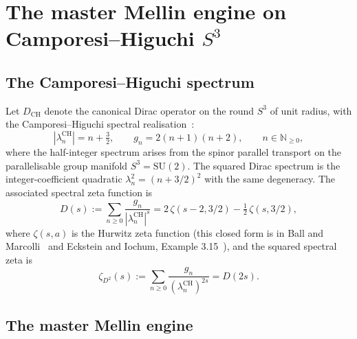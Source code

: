 \documentclass[11pt,a4paper]{article}
\theoremstyle{plain}
\theoremstyle{definition}
\newcommand{\sthree}{S^{3}}
\newcommand{\N}{\mathbb{N}}
\newcommand{\DCH}{D_{\mathrm{CH}}}
\begin{document}
\section{The master Mellin engine on Camporesi--Higuchi $\sthree$}
\label{sec:master_engine}

\subsection{The Camporesi--Higuchi spectrum}

Let $\DCH$ denote the canonical Dirac operator on the round $\sthree$
of unit radius, with the Camporesi--Higuchi spectral
realisation~\cite{camporesi_higuchi1996}:
\begin{equation}
\label{eq:ch_spectrum}
|\lambda_n^{\mathrm{CH}}| = n + \tfrac{3}{2}, \qquad
g_n = 2(n+1)(n+2), \qquad n \in \N_{\ge 0},
\end{equation}
where the half-integer spectrum arises from the spinor parallel
transport on the parallelisable group manifold $\sthree = \mathrm{SU}(2)$.
The squared Dirac spectrum is the integer-coefficient quadratic
$\lambda_n^2 = (n + 3/2)^2$ with the same degeneracy.  The associated
spectral zeta function is
\begin{equation}
\label{eq:dirac_dirichlet}
D(s) := \sum_{n \ge 0} \frac{g_n}{|\lambda_n^{\mathrm{CH}}|^s}
      = 2\,\zeta(s - 2, 3/2) - \tfrac{1}{2}\,\zeta(s, 3/2),
\end{equation}
where $\zeta(s, a)$ is the Hurwitz zeta function (this closed form is in
Ball and Marcolli~\cite{ball_marcolli2016} and Eckstein and Iochum, Example
3.15~\cite{eckstein_iochum2018}), and the squared spectral zeta is
\begin{equation}
\label{eq:dirac_squared_dirichlet}
\zeta_{D^2}(s) := \sum_{n \ge 0} \frac{g_n}{(\lambda_n^{\mathrm{CH}})^{2s}}
                = D(2s).
\end{equation}

\subsection{The master Mellin engine}
\end{document}

